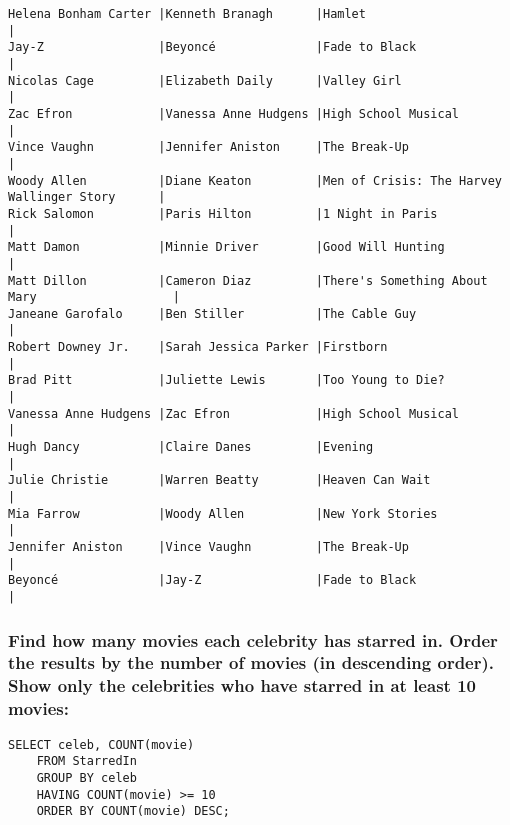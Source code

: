 \documentclass{article}
\begin{document}
\begin{verbatim}
Helena Bonham Carter |Kenneth Branagh      |Hamlet                                         |
Jay-Z                |Beyoncé              |Fade to Black                                  |
Nicolas Cage         |Elizabeth Daily      |Valley Girl                                    |
Zac Efron            |Vanessa Anne Hudgens |High School Musical                            |
Vince Vaughn         |Jennifer Aniston     |The Break-Up                                   |
Woody Allen          |Diane Keaton         |Men of Crisis: The Harvey Wallinger Story      |
Rick Salomon         |Paris Hilton         |1 Night in Paris                               |
Matt Damon           |Minnie Driver        |Good Will Hunting                              |
Matt Dillon          |Cameron Diaz         |There's Something About Mary                   |
Janeane Garofalo     |Ben Stiller          |The Cable Guy                                  |
Robert Downey Jr.    |Sarah Jessica Parker |Firstborn                                      |
Brad Pitt            |Juliette Lewis       |Too Young to Die?                              |
Vanessa Anne Hudgens |Zac Efron            |High School Musical                            |
Hugh Dancy           |Claire Danes         |Evening                                        |
Julie Christie       |Warren Beatty        |Heaven Can Wait                                |
Mia Farrow           |Woody Allen          |New York Stories                               |
Jennifer Aniston     |Vince Vaughn         |The Break-Up                                   |
Beyoncé              |Jay-Z                |Fade to Black                                  |
        \end{verbatim}
        
    \subsubsection*{Find how many movies each celebrity has starred in. Order the results by the number
of movies (in descending order). Show only the celebrities who have starred in at
least 10 movies:}
        \begin{verbatim}
SELECT celeb, COUNT(movie)
    FROM StarredIn
    GROUP BY celeb
    HAVING COUNT(movie) >= 10
    ORDER BY COUNT(movie) DESC;\end{verbatim}
    
\end{document}

